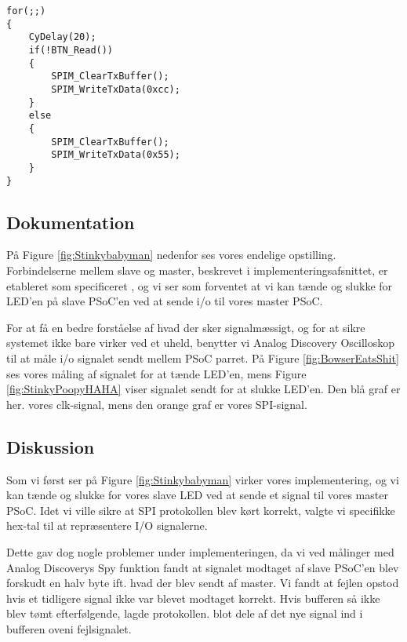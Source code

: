 \documentclass[../main.tex]{subfiles}
\begin{document}
\begin{lstlisting}[caption={Håndtering af knappens input på SPI Master - med knap}, label=lst:spi_master_btn]
for(;;)
{
    CyDelay(20);
    if(!BTN_Read())
    {
        SPIM_ClearTxBuffer();
        SPIM_WriteTxData(0xcc); 
    }
    else
    {
        SPIM_ClearTxBuffer();
        SPIM_WriteTxData(0x55);
    }
}
\end{lstlisting}

\subsection{Dokumentation}
På Figure \ref{fig:Stinkybabyman} nedenfor ses vores endelige opstilling. Forbindelserne mellem slave og master, beskrevet i implementeringsafsnittet, er etableret som specificeret
, og vi ser som forventet at vi kan tænde og slukke for LED'en på slave PSoC'en ved at sende i/o til vores master PSoC.


For at få en bedre forståelse af hvad der sker signalmæssigt, og for at sikre systemet ikke bare virker ved et uheld, benytter vi Analog Discovery Oscilloskop til at måle  i/o signalet sendt mellem PSoC parret.
 På Figure \ref{fig:BowserEatsShit} ses vores måling af signalet for at tænde LED'en, mens Figure \ref{fig:StinkyPoopyHAHA} viser signalet sendt for at slukke LED'en. Den blå graf er her.
 vores clk-signal, mens den orange graf er vores SPI-signal. 

 
\subsection{Diskussion}
Som vi først ser på Figure \ref{fig:Stinkybabyman} virker vores implementering, og vi kan tænde og slukke for vores slave LED ved at sende et signal til vores master PSoC.
Idet vi ville sikre at SPI protokollen blev kørt korrekt, valgte vi specifikke hex-tal til at repræsentere I/O signalerne. 

Dette gav dog nogle problemer under implementeringen, da vi ved målinger med Analog Discoverys Spy funktion fandt at signalet modtaget af slave PSoC'en blev forskudt en halv byte 
ift. hvad der blev sendt af master. Vi fandt at fejlen opstod hvis et tidligere signal ikke var blevet modtaget korrekt. Hvis bufferen så ikke blev tømt efterfølgende, lagde protokollen.
blot dele af det nye signal ind i bufferen oveni fejlsignalet.
\end{document}
